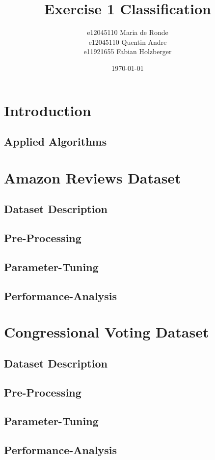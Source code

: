 \documentclass[11pt]{article}
\title{Exercise 1 Classification}
\author{e12045110 Maria de Ronde \\ e12045110  Quentin Andre  \\ e11921655 Fabian Holzberger}
\date{\today}
\begin{document}
\graphicspath{{./figures/}}
\maketitle

%
\section{Introduction}

\subsection{Applied Algorithms}

\section{Amazon Reviews Dataset}
\subsection{Dataset Description}
\subsection{Pre-Processing}
\subsection{Parameter-Tuning}
\subsection{Performance-Analysis}

\section{Congressional Voting Dataset}
\subsection{Dataset Description}
\subsection{Pre-Processing}
\subsection{Parameter-Tuning}
\subsection{Performance-Analysis}
\end{document}
